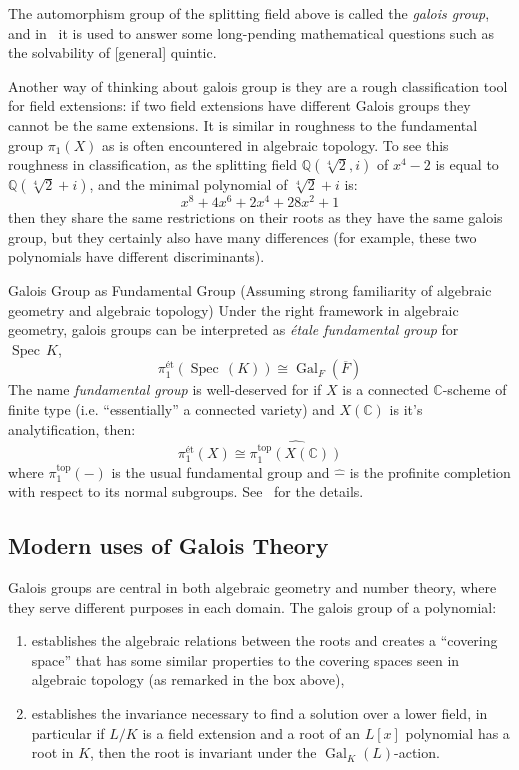 \documentclass{article}
\newcommand{\C}{{\mathbb{C}}}
\newcommand{\Q}{{\mathbb{Q}}}
\newcommand{\Gal}{{\operatorname{Gal}}}
\newcommand{\Spec}{{\operatorname{Spec}\,}}
\newcommand{\qn}{\quad\newline}
\begin{document}
The automorphism group of the splitting field above is called the \emph{galois group}, and
in~\cite{NateAlgebra} it is used to answer some long-pending mathematical questions such as the
solvability of [general] quintic.

Another way of thinking about galois group is they are a rough classification tool for field
extensions: if two field extensions have different Galois groups they cannot be the same extensions. It is
similar in roughness to the fundamental group $\pi_1(X)$ as is often encountered in algebraic topology.
To see this roughness in classification, as the splitting field
$\Q(\sqrt[4]{2}, i)$ of $x^4-2$ is equal to $\Q(\sqrt[4]{2} + i)$, and the minimal polynomial of
$\sqrt[4]{2}+i$ is:
\[
	x^8 + 4 x^6 + 2 x^4 + 28 x^2 + 1
\]
then they share the same restrictions on their roots as they have the same galois group, but they certainly
also have many differences (for example, these two polynomials have different discriminants).

\begin{titledBox*}{Galois Group as Fundamental Group}
	\qn
	(Assuming strong familiarity of algebraic geometry and algebraic topology) Under the right framework in algebraic geometry,
	galois groups can be interpreted as \emph{\'etale fundamental group} for $\Spec K$,
	\[
		\pi^{\text{\'et}}_1(\Spec(K)) \cong \Gal_F(\overline{F})
		\]
	The name \emph{fundamental group} is well-deserved for if $X$
	is a connected $\C$-scheme of finite type (i.e. ``essentially'' a connected variety) and $X(\C)$ is it's
	analytification, then:
	\[
		\pi^{\text{\'et}}_1(X) \cong \widehat{\pi_1^{\operatorname{top}}(X(\C))}
	\]
	where $\pi_1^{\operatorname{top}}(-)$ is the usual fundamental group and $\widehat{-}$ is the profinite
	completion with respect to its normal subgroups. See~\cite{NateAlgGeo} for the details.
\end{titledBox*}


\subsection*{Modern uses of Galois Theory}

Galois groups are central in both algebraic geometry and number theory, where they serve different purposes in
each domain. The galois group of a polynomial:
\begin{enumerate}
	\item establishes the algebraic relations between the roots and creates a ``covering space'' that has some
		similar properties to the covering spaces seen in algebraic topology (as remarked in the box above),
	\item establishes the invariance necessary to find a solution over a lower field, in particular if $L/K$
		is a field extension and a root of an $L[x]$ polynomial has a root in $K$, then the root is invariant under the
		$\Gal_K(L)$-action.
\end{enumerate}
\newpage
\printbibliography
\end{document}
